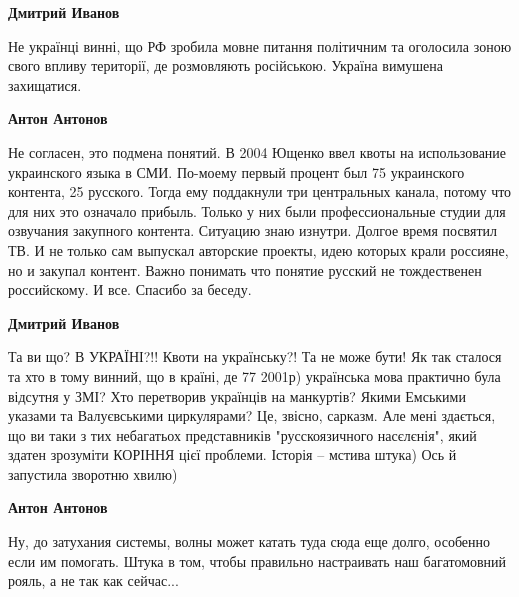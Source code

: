 \begin{itemize}
\begin{itemize}
\textbf{Дмитрий Иванов} 

Не українці винні, що РФ зробила мовне питання
політичним та оголосила зоною свого впливу території, де розмовляють
російською. Україна вимушена захищатися.

 
\textbf{Антон Антонов} 

Не согласен, это подмена понятий. В 2004 Ющенко ввел квоты на использование
украинского языка в СМИ. По-моему первый процент был 75 украинского контента,
25 русского. Тогда ему поддакнули три центральных канала, потому что для них
это означало прибыль. Только у них были профессиональные студии для озвучания
закупного контента. Ситуацию знаю изнутри. Долгое время посвятил ТВ. И не
только сам выпускал авторские проекты, идею которых крали россияне, но и
закупал контент. Важно понимать что понятие русский не тождественен
российскому. И все. Спасибо за беседу.


 
\textbf{Дмитрий Иванов} 

Та ви що? В УКРАЇНІ?!! Квоти на українську?! Та не може бути! Як так сталося та
хто в тому винний, що в країні, де 77%
2001р) українська мова практично була відсутня у ЗМІ? Хто перетворив українців
на манкуртів? Якими Емськими указами та Валуєвськими циркулярами? Це, звісно,
сарказм. Але мені здається, що ви таки з тих небагатьох представників
"русскоязичного насєлєнія", який здатен зрозуміти КОРІННЯ цієї проблеми.
Історія – мстива штука) Ось й запустила зворотню хвилю)


 
\textbf{Антон Антонов} 

Ну, до затухания системы, волны может катать туда сюда еще долго, особенно если
им помогать. Штука в том, чтобы правильно настраивать наш багатомовний рояль, а
не так как сейчас...


\end{itemize}
\end{itemize}
